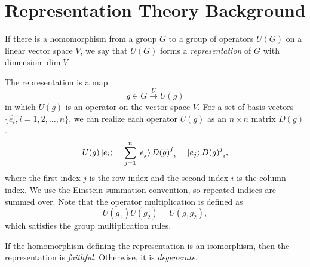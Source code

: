 \chapter{Representation Theory Background}
\label{ch:rep_background}

\begin{definition}
    If there is a homomorphism from a group $G$ to a group of operators $U(G)$ on a linear vector space $V$, we say that $U(G)$ forms a \textit{representation} of $G$ with dimension $\dim V$.
\end{definition}

The representation is a map
\begin{equation}
    g\in G\xrightarrow{U} U(g)
\end{equation}
in which $U(g)$ is an operator on the vector space $V$. For a set of basis vectors $\{\hat{e_i},i=1,2,\dots,n\}$, we can realize each operator $U(g)$ as an $n\times n$ matrix $D(g)$.
\begin{equation}
    U(g)\ket{e_i} = \sum_{j=1}^n \ket{e_j}{{D(g)}^j}_i = \ket{e_j}{{D(g)}^j}_i,
\end{equation}
where the first index $j$ is the row index and the second index $i$ is the column index. We use the Einstein summation convention, so repeated indices are summed over. Note that the operator multiplication is defined as
\begin{equation}
    U(g_1)U(g_2) = U(g_1g_2),
\end{equation}
which satisfies the group multiplication rules.

\begin{definition}
    If the homomorphism defining the representation is an isomorphism, then the representation is \textit{faithful}. Otherwise, it is \textit{degenerate}.
\end{definition}

